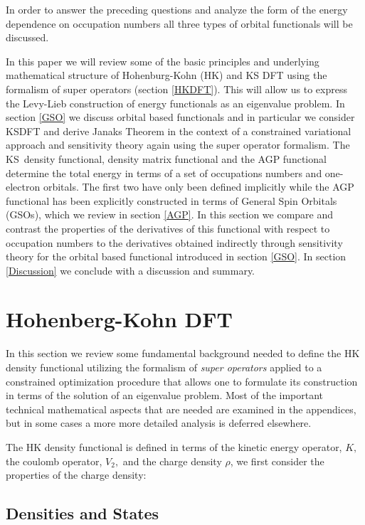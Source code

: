 \documentclass[aps,preprint]{revtex4}%
\begin{document}
In order to answer the preceding questions and analyze the form of the energy
dependence on occupation numbers all three types of orbital functionals will
be discussed.

In this paper we will review some of the basic principles and underlying
mathematical structure of Hohenburg-Kohn (HK) \cite{HK1964} and KS DFT using
the formalism of super operators \cite{Lowdin1982} (section \ref{HKDFT}). This
will allow us to express the Levy-Lieb construction of energy functionals as
an eigenvalue problem. In section \ref{GSO} we discuss orbital based
functionals and in particular we consider KSDFT and derive Janaks Theorem in
the context of a constrained variational approach and sensitivity theory again
using the super operator formalism. The KS\ density functional, density matrix
functional and the AGP functional determine the total energy in terms of a set
of occupations numbers and one-electron orbitals. The first two have only been
defined implicitly while the AGP functional has been explicitly constructed
\cite{OrtizWeiner2006} in terms of General Spin Orbitals (GSOs), which we
review in section \ref{AGP}. In this section we compare and contrast the
properties of the derivatives of this functional with respect to occupation
numbers to the derivatives obtained indirectly through sensitivity theory for
the orbital based functional introduced in section \ref{GSO}. In section
\ref{Discussion} we conclude with a discussion and summary.

\section{Hohenberg-Kohn DFT\label{HKDFT}}

In this section we review some fundamental background needed to define the HK
density functional utilizing the formalism of \emph{super operators}
\cite{Lowdin1982} applied to a constrained optimization procedure that allows
one to formulate its construction in terms of the solution of an eigenvalue
problem. Most of the important technical mathematical aspects that are needed
are examined in the appendices, but in some cases a more more detailed
analysis is deferred elsewhere.

The HK density functional is defined in terms of the kinetic energy operator,
$K,$ the coulomb operator, $V_{2},$ and the charge density $\rho$, we first
consider the properties of the charge density:

\subsection{Densities and States\label{DenStat}}
\end{document}
